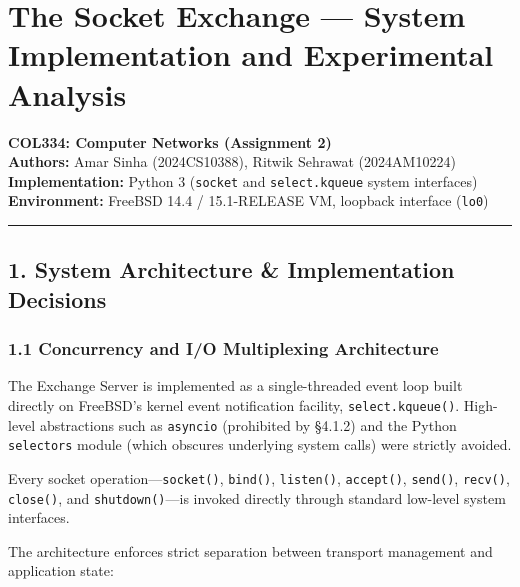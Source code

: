 \documentclass[
]{article}
\author{}
\date{}
\begin{document}
{
\hypersetup{linkcolor=}
\setcounter{tocdepth}{3}
\tableofcontents
}
\hypertarget{the-socket-exchange-system-implementation-and-experimental-analysis}{%
\section{The Socket Exchange --- System Implementation and Experimental
Analysis}\label{the-socket-exchange-system-implementation-and-experimental-analysis}}

\textbf{COL334: Computer Networks (Assignment 2)}\\
\textbf{Authors:} Amar Sinha (2024CS10388), Ritwik Sehrawat
(2024AM10224)\\
\textbf{Implementation:} Python 3 (\texttt{socket} and
\texttt{select.kqueue} system interfaces)\\
\textbf{Environment:} FreeBSD 14.4 / 15.1-RELEASE VM, loopback interface
(\texttt{lo0})

\begin{center}\rule{0.5\linewidth}{0.5pt}\end{center}

\hypertarget{system-architecture-implementation-decisions}{%
\subsection{1. System Architecture \& Implementation
Decisions}\label{system-architecture-implementation-decisions}}

\hypertarget{concurrency-and-io-multiplexing-architecture}{%
\subsubsection{1.1 Concurrency and I/O Multiplexing
Architecture}\label{concurrency-and-io-multiplexing-architecture}}

The Exchange Server is implemented as a single-threaded event loop built
directly on FreeBSD's kernel event notification facility,
\texttt{select.kqueue()}. High-level abstractions such as
\texttt{asyncio} (prohibited by §4.1.2) and the Python
\texttt{selectors} module (which obscures underlying system calls) were
strictly avoided.

Every socket operation---\texttt{socket()}, \texttt{bind()},
\texttt{listen()}, \texttt{accept()}, \texttt{send()}, \texttt{recv()},
\texttt{close()}, and \texttt{shutdown()}---is invoked directly through
standard low-level system interfaces.

The architecture enforces strict separation between transport management
and application state:
\end{document}
